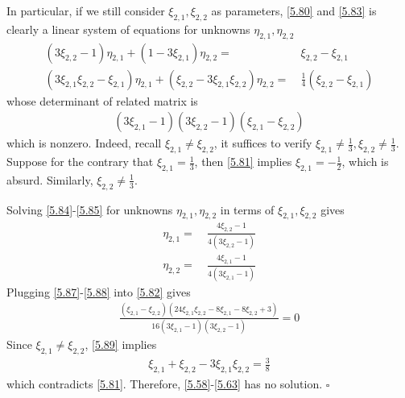 \documentclass[a4paper]{article}
\numberwithin{equation}{section}
\begin{document}
In particular, if we still consider $\xi _{2,1},\xi _{2,2}$ as parameters, \eqref{5.80} and \eqref{5.83} is clearly a linear system of equations for unknowns $\eta _{2,1},\eta _{2,2}$
\begin{align}
\label{5.84}
\left( {3{\xi _{2,2}} - 1} \right){\eta _{2,1}} + \left( {1 - 3{\xi _{2,1}}} \right){\eta _{2,2}} =&\ {\xi _{2,2}} - {\xi _{2,1}}\\
\left( {3{\xi _{2,1}}{\xi _{2,2}} - {\xi _{2,1}}} \right){\eta _{2,1}} + \left( {{\xi _{2,2}} - 3{\xi _{2,1}}{\xi _{2,2}}} \right){\eta _{2,2}} =&\ \frac{1}{4}\left( {{\xi _{2,2}} - {\xi _{2,1}}} \right) \label{5.85}
\end{align}
whose determinant of related matrix is
\begin{align}
\left( {3{\xi _{2,1}} - 1} \right)\left( {3{\xi _{2,2}} - 1} \right)\left( {{\xi _{2,1}} - {\xi _{2,2}}} \right)
\end{align}
which is nonzero. Indeed, recall ${\xi _{2,1}} \ne {\xi _{2,2}}$, it suffices to verify ${\xi _{2,1}} \ne \frac{1}{3},{\xi _{2,2}} \ne \frac{1}{3}$. Suppose for the contrary that ${\xi _{2,1}} = \frac{1}{3}$, then \eqref{5.81} implies ${\xi _{2,1}} = -\frac{1}{2}$, which is absurd. Similarly, ${\xi _{2,2}} \ne \frac{1}{3}$.

Solving \eqref{5.84}-\eqref{5.85} for unknowns $\eta _{2,1},\eta _{2,2}$ in terms of $\xi _{2,1},\xi _{2,2}$ gives
\begin{align}
\label{5.87}
{\eta _{2,1}} =&\ \frac{{4{\xi _{2,2}} - 1}}{{4\left( {3{\xi _{2,2}} - 1} \right)}}\\
{\eta _{2,2}} =&\ \frac{{4{\xi _{2,1}} - 1}}{{4\left( {3{\xi _{2,1}} - 1} \right)}} \label{5.88}
\end{align}
Plugging \eqref{5.87}-\eqref{5.88} into \eqref{5.82} gives
\begin{align}
\label{5.89}
\frac{{\left( {{\xi _{2,1}} - {\xi _{2,2}}} \right)\left( {24{\xi _{2,1}}{\xi _{2,2}} - 8{\xi _{2,1}} - 8{\xi _{2,2}} + 3} \right)}}{{16\left( {3{\xi _{2,1}} - 1} \right)\left( {3{\xi _{2,2}} - 1} \right)}} = 0
\end{align}
Since ${{\xi _{2,1}} \ne {\xi _{2,2}}}$, \eqref{5.89} implies
\begin{align}
{\xi _{2,1}} + {\xi _{2,2}} - 3{\xi _{2,1}}{\xi _{2,2}} = \frac{3}{8}
\end{align}
which contradicts \eqref{5.81}. Therefore, \eqref{5.58}-\eqref{5.63} has no solution. \hfill $\square$\\
\end{document}
